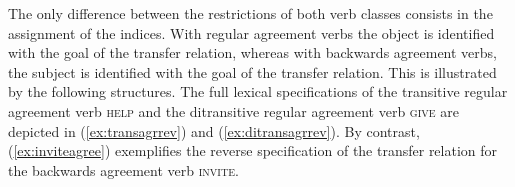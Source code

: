 \documentclass[11pt,a4paper,fleqn]{article}
\begin{document}
\begin{exe}
\ex  \label{ex:regagreev}
\end{exe}

\begin{exe}
\ex  \label{ex:backagreev}

\end{exe}

The only difference between the restrictions of both verb classes consists in the assignment of the indices. With regular agreement verbs the object is identified with the goal of the transfer relation, whereas with backwards agreement verbs, the subject is identified with the goal of the transfer relation. This is illustrated by the following structures. The full lexical specifications of the transitive regular agreement verb \textsc{help} and the ditransitive regular agreement verb \textsc{give} are depicted in (\ref{ex:transagrrev}) and (\ref{ex:ditransagrrev}). By contrast, (\ref{ex:inviteagree}) exemplifies the reverse specification of the transfer relation for the backwards agreement verb  \textsc{invite}.
\end{document}
